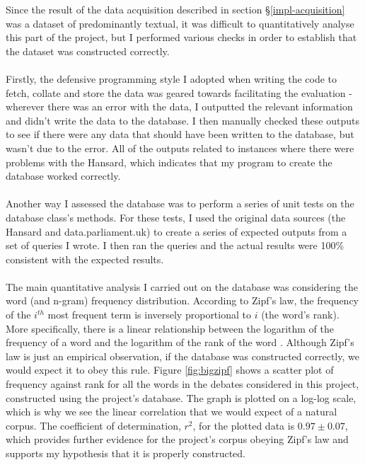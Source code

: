 \documentclass[12pt,a4paper,twoside,openright]{report}
\begin{document}
Since the result of the data acquisition described in section \S\ref{impl-acquisition} was a dataset of predominantly textual, it was difficult to quantitatively analyse this part of the project, but I performed various checks in order to establish that the dataset was constructed correctly.
\\\\
Firstly, the defensive programming style I adopted when writing the code to fetch, collate and store the data was geared towards facilitating the evaluation - wherever there was an error with the data, I outputted the relevant information and didn't write the data to the database. I then manually checked these outputs to see if there were any data that should have been written to the database, but wasn't due to the error. All of the outputs related to instances where there were problems with the Hansard, which indicates that my program to create the database worked correctly.
\\\\
Another way I assessed the database was to perform a series of unit tests on the database class's methods. For these tests, I used the original data sources (the Hansard and data.parliament.uk) to create a series of expected outputs from a set of queries I wrote. I then ran the queries and the actual results were 100\% consistent with the expected results.
\\\\
The main quantitative analysis I carried out on the database was considering the word (and n-gram) frequency distribution. According to Zipf's law, the frequency of the $i^{th}$ most frequent term is inversely proportional to $i$ (the word's rank). More specifically, there is a linear relationship between the logarithm of the frequency of a word and the logarithm of the rank of the word \cite{zipf}. Although Zipf's law is just an empirical observation, if the database was constructed correctly, we would expect it to obey this rule. Figure \ref{fig:bigzipf} shows a scatter plot of frequency against rank for all the words in the debates considered in this project, constructed using the project's database. The graph is plotted on a log-log scale, which is why we see the linear correlation that we would expect of a natural corpus. The coefficient of determination, $r^2$, for the plotted data is $0.97 \pm 0.07$\footnotemark, which provides further evidence for the project's corpus obeying Zipf's law and supports my hypothesis that it is properly constructed.
\\\\
\end{document}
